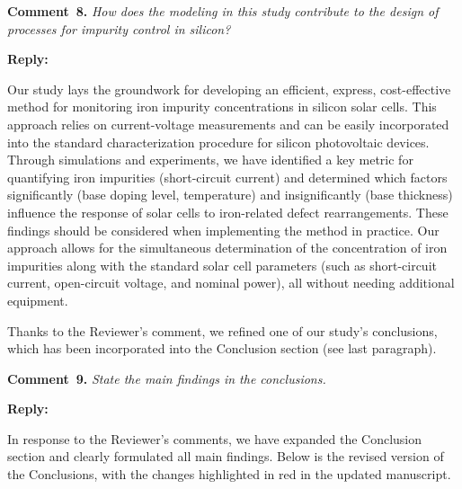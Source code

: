\documentclass[a4paper,fleqn]{cas-sc}
\begin{document}
%
%
\vspace{1cm}
\noindent
\textcolor[rgb]{0.00,0.50,1.00}{\textbf{Comment~8.}}
\emph{How does the modeling in this study contribute to the design of processes for impurity control in silicon?}


\noindent
\textcolor[rgb]{0.51,0.00,0.00}{\textbf{Reply:}}


Our study lays the groundwork for developing an efficient, express, cost-effective method for monitoring iron impurity concentrations in silicon solar cells.
This approach relies on current-voltage measurements and can be easily incorporated into the standard characterization procedure for silicon photovoltaic devices.
Through simulations and experiments, we have identified a key metric for quantifying iron impurities (short-circuit current) and determined which factors significantly (base doping level, temperature) and insignificantly (base thickness) influence the response of solar cells to iron-related defect rearrangements.
These findings should be considered when implementing the method in practice.
Our approach allows for the simultaneous determination of the concentration of iron impurities along with the standard solar cell parameters (such as short-circuit current, open-circuit voltage, and nominal power), all without needing additional equipment.

Thanks to the Reviewer's comment, we refined one of our study's conclusions, which has been incorporated into the Conclusion section (see last paragraph).



%

\vspace{1cm}
\noindent
\textcolor[rgb]{0.00,0.50,1.00}{\textbf{Comment~9.}}
\emph{State the main findings in the conclusions.}


\noindent
\textcolor[rgb]{0.51,0.00,0.00}{\textbf{Reply:}}


In response to the Reviewer's comments, we have expanded the Conclusion section and clearly formulated all main findings.
Below is the revised version of the Conclusions, with the changes highlighted in red in the updated manuscript.
\end{document}
